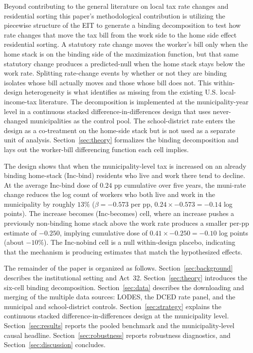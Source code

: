 \documentclass[12pt]{article}
\begin{document}
Beyond contributing to the general literature on local tax rate changes and residential sorting  this paper's methodological contribution is utilizing the piecewise structure of the EIT to generate a binding decomposition to test how rate changes that move the tax bill from the work side to the home side effect residential sorting. A statutory rate change moves the worker's bill only when the home stack is on the binding side of the
maximization function, but that same statutory change produces a predicted-null when
the home stack stays below the work rate. Splitting
rate-change events by whether or not they are binding isolates
whose bill actually moves and those whose bill does not. This within-design heterogeneity is what \citet{agrawalLessonsStateLocal} identifies as missing from the existing U.S. local-income-tax literature.
The decomposition is implemented at the municipality-year level in
a continuous stacked difference-in-differences design that uses
never-changed municipalities as the control pool. The
school-district rate enters the design as a co-treatment on the
home-side stack but is not used as a separate unit of analysis.
Section~\ref{sec:theory} formalizes the binding decomposition and
lays out the worker-bill differencing function each cell implies.

The design shows that when the municipality-level tax is increased on an already binding home-stack (Inc-bind) residents who live and work there tend to decline. At the average Inc-bind dose of $0.24$ pp cumulative
over five years, the muni-rate change reduces the log count of
workers who both live and work in the municipality by roughly
$13\%$ ($\beta = -0.573$ per pp, $0.24 \times -0.573 = -0.14$ log
points). The increase becomes (Inc-becomes) cell, where an increase pushes a
previously non-binding home stack above the work rate produces a
smaller per-pp estimate of $-0.250$, implying cumulative dose of $0.41 \times -0.250 =
-0.10$ log points (about $-10\%$). The Inc-nobind cell is a null
within-design placebo, indicating that the mechanism is producing estimates that match the hypothesized effects.

The remainder of the paper is organized as follows.
Section~\ref{sec:background} describes the institutional setting and
Act~32. Section~\ref{sec:theory} introduces the six-cell binding
decomposition. Section~\ref{sec:data} describes the downloading and merging of the multiple data sources: LODES, the DCED rate
panel, and the municipal and school-district controls.
Section~\ref{sec:strategy} explains the continuous stacked
difference-in-differences design at the municipality level.
Section~\ref{sec:results} reports the pooled benchmark and the
municipality-level causal headline.
Section~\ref{sec:robustness} reports robustness diagnostics, and
Section~\ref{sec:discussion} concludes.
\end{document}
